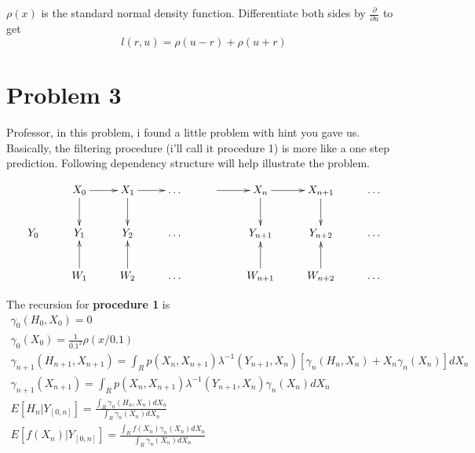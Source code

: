 \documentclass[a4paper,10pt]{article}
\begin{document}
$\rho(x)$ is the standard normal density function. Differentiate both sides by $\frac{\partial}{\partial u}$ to get
\begin{equation}
l(r,u) = \rho(u-r) + \rho(u+r) \nonumber
\end{equation}


\section{Problem 3}
Professor, in this problem, i found a little problem with hint you gave us. Basically, the filtering procedure (i'll call it procedure 1) is more like a one step prediction. Following dependency structure will help illustrate the problem.

\begin{equation} \label{prob3_depend}
\xymatrix{  & X_0 \ar[d] \ar[r] & X_1 \ar[d] \ar[r] & \ldots & \ar[r] & X_n \ar[d] \ar[r] & X_{n+1} \ar[d] & \ldots \\
        Y_0 & Y_1               & Y_2               & \ldots &        & Y_{n+1}           & Y_{n+2}        & \ldots \\
            & W_1 \ar[u]        & W_2 \ar[u]        & \ldots &        & W_{n+1} \ar[u]    & W_{n+2} \ar[u] &\ldots \\ }
\end{equation}

The recursion for \textbf{procedure 1} is
\begin{eqnarray}
\gamma_0(H_0, X_0) = 0  \\
\gamma_0(X_0) = \frac{1}{0.1^2}\rho(x/0.1)  \\
\gamma_{n+1}(H_{n+1}, X_{n+1}) = \int_R p(X_n, X_{n+1}) \lambda^{-1}(Y_{n+1}, X_{n})[\gamma_n(H_n, X_n) + X_n \gamma_n(X_n)]dX_n  \\
\gamma_{n+1}(X_{n+1}) = \int_R p(X_n, X_{n+1}) \lambda^{-1}(Y_{n+1}, X_{n})\gamma_n(X_n)dX_n  \\
E[H_n|Y_{[0,n]}] = \frac{\int_R \gamma_n(H_n, X_n) dX_n}{\int_R \gamma_n(X_n)dX_n} \\
E[f(X_n) | Y_{[0,n]}] = \frac{\int_R f(X_n)\gamma_n(X_n)dX_n }{\int_R \gamma_n(X_n)dX_n}
\end{eqnarray}
\end{document}
